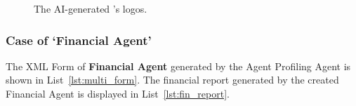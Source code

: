\begin{figure}[htbp]
    \centering
    \caption{The AI-generated \model's logos. }\label{fig:logos}
\end{figure}

\subsubsection{Case of `Financial Agent'}
The XML Form of \textbf{Financial Agent} generated by the Agent Profiling Agent is shown in List~\ref{lst:multi_form}. The financial report generated by the created Financial Agent is displayed in List~\ref{lst:fin_report}.

